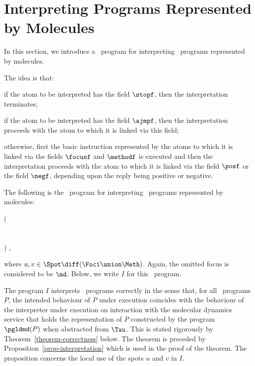 \documentclass[fleqn]{llncs}
\begin{document}
\section{Interpreting Programs Represented by Molecules}
\label{sect-interpretation}

In this section, we introduce a \PGA\ program for interpreting \PGLD\
programs represented by molecules.

The idea is that:
\begin{iteml}
\item
if the atom to be interpreted has the field $\stopf$, then the
interpretation terminates;
\item
if the atom to be interpreted has the field $\ajmpf$, then the
interpretation proceeds with the atom to which it is linked via this
field;
\item
otherwise, first the basic instruction represented by the atoms to which it
is linked via the fields $\focusf$ and $\methodf$ is executed and then
the interpretation proceeds with the atom to which it is linked via the
field $\posf$ or the field $\negf$, depending upon the reply being
positive or negative.
\end{iteml}

The following is the \PGA\ program for interpreting \PGLD\ programs
represented by molecules:
\begin{ldispl}
\begin{aeqns}
( \conc \halt \conc
{} \\ \phantom{(}
  \conc {} \conc
{} \\ \phantom{(}
  \conc {} \conc
  \conc {} \conc
   \conc {} \conc
   \conc {} \conc
{} \\ \phantom{(}
 ) \rep\;,
\end{aeqns}
\end{ldispl}
where $u,v \in \Spot \diff (\Foci \union \Meth)$.
Again, the omitted focus is considered to be $\md$.
Below, we write $I$ for this \PGA\ program.

The program $I$ interprets \PGLD\ programs correctly in the sense that,
for all \PGLD\ programs $P$, the intended behaviour of $P$ under
execution coincides with the behaviour of the interpreter under
execution on interaction with the molecular dynamics service that holds
the representation of $P$ constructed by the program $\pgldmd(P)$ when
abstracted from $\Tau$.
This is stated rigorously by Theorem~\ref{theorem-correctness} below.
The theorem is preceded by Proposition~\ref{prop-interpretation} which is
used in the proof of the theorem.
The proposition concerns the local use of the spots $u$ and $v$ in $I$.
\end{document}
